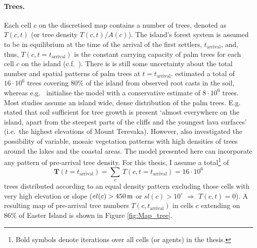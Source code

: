 \paragraph{Trees.}
Each cell $c$ on the discretised map contains a number of trees, denoted as $T(c,t)$ (or tree density $T(c,t)/A(c)$).
The island's forest system is assumed to be in equilibrium at the time of the arrival of the first settlers, $t_\text{arrival}$, and, thus, $T(c,t=t_\text{arrival})$ is the constant carrying capacity of palm trees for each cell $c$ on the island (c.f.\ ).
There is is still some uncertainty about the total number and spatial patterns of palm trees at $t=t_\text{arrival}$.
\citet{Mieth2015} estimated a total of $16\cdot 10^6$ trees covering $80\%$ of the island from observed root casts in the soil, whereas e.g.\ \citet{Brandt2015} initialise the model with a conservative estimate of $8\cdot 10^6$ trees. 
Most studies assume an island wide, dense distribution of the palm trees. 
E.g.\ \citet{Bahn2017} stated that soil sufficient for tree growth is present `almost everywhere on the island, apart from the steepest parts of the cliffs and the youngest lava surfaces' (i.e.\ the highest elevations of Mount Terevaka). 
However, \citet{Rull2020} also investigated the possibility of variable, mosaic vegetation patterns with high densities of trees around the lakes and the coastal areas.
The model presented here can incorporate any pattern of pre-arrival tree density. 
For this thesis, I assume a total\footnote{Bold symbols denote iterations over all cells (or agents) in the thesis.} of 
\begin{equation}
\mathbf{T}(t=t_\text{arrival}) = \sum_{c} \, T(c,t=t_\text{arrival}) =  16 \cdot 10^6
\end{equation} 
trees distributed according to an equal density pattern excluding those cells with very high elevation or slope ($el(c)>450\, {\rm m}$ or $sl(c)>10^\circ$ $\Rightarrow$ $T(c,t) = 0$).
A resulting map of pre-arrival tree numbers $T(c,t_\text{arrival})$ in cells $c$ extending on $86\%$ of Easter Island is shown in Figure \ref{fig:Map_tree}.

